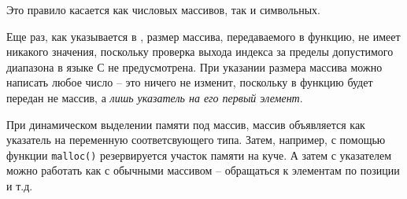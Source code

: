 \documentclass[%
	11pt,
	a4paper,
	utf8,
		]{article}
\begin{document}
Это правило касается как числовых массивов, так и символьных.

Еще раз, как указывается в \cite[]{koltzov-c-lang:2019}, размер массива, передаваемого в функцию, не имеет никакого значения, поскольку проверка выхода индекса за пределы допустимого диапазона в языке С не предусмотрена. При указании размера массива можно написать любое число -- это ничего не изменит, поскольку в функцию будет передан не массив, а \emph{лишь указатель на его первый элемент}.

При динамическом выделении памяти под массив, массив объявляется как указатель на переменную соответсвующего типа. Затем, например, с помощью функции \texttt{malloc()} резервируется участок памяти на куче. А затем с указателем можно работать как с обычными массивом -- обращаться к элементам по позиции и т.д.



\begin{thebibliography}{99}
\end{thebibliography}


\lstlistoflistings{}
\end{document}
